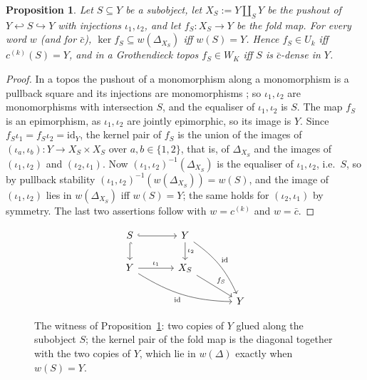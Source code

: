 \documentclass[11pt]{amsart}
\newtheorem{prop}[thm]{Proposition}
\theoremstyle{definition}
\begin{document}
\begin{prop}\label{prop:witness}
Let $S\subseteq Y$ be a subobject, let $X_S:=Y\amalg_SY$ be the pushout of
$Y\hookleftarrow S\hookrightarrow Y$ with injections $\iota_1,\iota_2$, and let
$f_S\colon X_S\to Y$ be the fold map. For every word $w$ (and for $\bar c$),
$\ker f_S\subseteq w(\Delta_{X_S})$ iff $w(S)=Y$. Hence $f_S\in U_k$ iff
$c^{(k)}(S)=Y$, and in a Grothendieck topos $f_S\in W_K$ iff $S$ is
$\bar c$-dense in $Y$.
\end{prop}
\begin{proof}
In a topos the pushout of a monomorphism along a monomorphism is a pullback
square and its injections are monomorphisms \cite[A2.4]{Elephant}; so
$\iota_1,\iota_2$ are monomorphisms with intersection $S$, and the equaliser
of $\iota_1,\iota_2$ is $S$. The map $f_S$ is an epimorphism, as $\iota_1,
\iota_2$ are jointly epimorphic, so its image is $Y$. Since $f_S\iota_1=
f_S\iota_2=\mathrm{id}_Y$, the kernel pair of $f_S$ is the union of the
images of $(\iota_a,\iota_b)\colon Y\to X_S\times X_S$ over $a,b\in\{1,2\}$,
that is, of $\Delta_{X_S}$ and the images of $(\iota_1,\iota_2)$ and
$(\iota_2,\iota_1)$. Now $(\iota_1,\iota_2)^{-1}(\Delta_{X_S})$ is the
equaliser of $\iota_1,\iota_2$, i.e.\ $S$, so by pullback stability
$(\iota_1,\iota_2)^{-1}(w(\Delta_{X_S}))=w(S)$, and the image of
$(\iota_1,\iota_2)$ lies in $w(\Delta_{X_S})$ iff $w(S)=Y$; the same holds
for $(\iota_2,\iota_1)$ by symmetry. The last two assertions follow with
$w=c^{(k)}$ and $w=\bar c$.
\end{proof}

\begin{figure}[ht]
\[
\begin{tikzcd}[column sep=large]
S\arrow[r,hook]\arrow[d,hook] & Y\arrow[d,"\iota_2"]\arrow[ddr,bend left=15,"\mathrm{id}"]\\
Y\arrow[r,"\iota_1"]\arrow[drr,bend right=15,"\mathrm{id}"'] & X_S\arrow[dr,"f_S"]\\
& & Y
\end{tikzcd}
\]
\caption{The witness of Proposition~\ref{prop:witness}: two copies of $Y$
glued along the subobject $S$; the kernel pair of the fold map is the
diagonal together with the two copies of $Y$, which lie in $w(\Delta)$
exactly when $w(S)=Y$.}
\end{figure}
\end{document}

